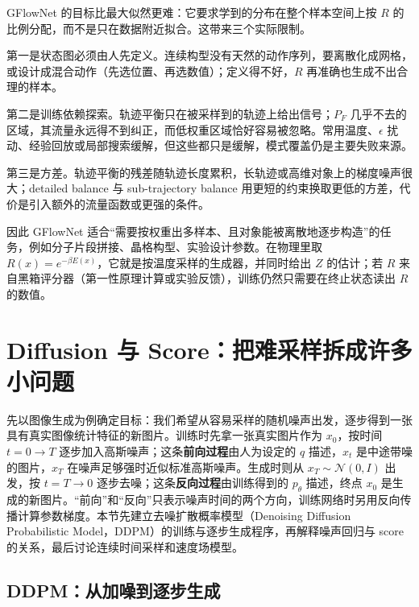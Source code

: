 GFlowNet 的目标比最大似然更难：它要求学到的分布在整个样本空间上按 \(R\) 的比例分配，而不是只在数据附近拟合。这带来三个实际限制。

第一是状态图必须由人先定义。连续构型没有天然的动作序列，要离散化成网格，或设计成混合动作（先选位置、再选数值）；定义得不好，\(R\) 再准确也生成不出合理的样本。

第二是训练依赖探索。轨迹平衡只在被采样到的轨迹上给出信号；\(P_F\) 几乎不去的区域，其流量永远得不到纠正，而低权重区域恰好容易被忽略。常用温度、\(\epsilon\) 扰动、经验回放或局部搜索缓解，但这些都只是缓解，模式覆盖仍是主要失败来源。

第三是方差。轨迹平衡的残差随轨迹长度累积，长轨迹或高维对象上的梯度噪声很大；detailed balance 与 sub-trajectory balance 用更短的约束换取更低的方差，代价是引入额外的流量函数或更强的条件。

因此 GFlowNet 适合“需要按权重出多样本、且对象能被离散地逐步构造”的任务，例如分子片段拼接、晶格构型、实验设计参数。在物理里取 \(R(x)=e^{-\beta E(x)}\)，它就是按温度采样的生成器，并同时给出 \(Z\) 的估计；若 \(R\) 来自黑箱评分器（第一性原理计算或实验反馈），训练仍然只需要在终止状态读出 \(R\) 的数值。

\section{Diffusion 与 Score：把难采样拆成许多小问题}
\label{sec:diffusion-score}

先以图像生成为例确定目标：我们希望从容易采样的随机噪声出发，逐步得到一张具有真实图像统计特征的新图片。训练时先拿一张真实图片作为 \(x_0\)，按时间 \(t=0\to T\) 逐步加入高斯噪声；这条\textbf{前向过程}由人为设定的 \(q\) 描述，\(x_t\) 是中途带噪的图片，\(x_T\) 在噪声足够强时近似标准高斯噪声。生成时则从 \(x_T\sim\mathcal N(0,I)\) 出发，按 \(t=T\to0\) 逐步去噪；这条\textbf{反向过程}由训练得到的 \(p_\theta\) 描述，终点 \(x_0\) 是生成的新图片。“前向”和“反向”只表示噪声时间的两个方向，训练网络时另用反向传播计算参数梯度。本节先建立去噪扩散概率模型（Denoising Diffusion Probabilistic Model，DDPM）的训练与逐步生成程序，再解释噪声回归与 score 的关系，最后讨论连续时间采样和速度场模型。

\subsection{DDPM：从加噪到逐步生成}

